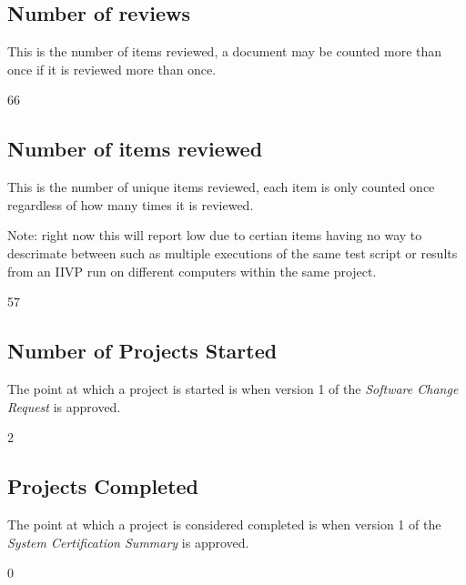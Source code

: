 \documentclass{article}
\begin{document}
\subsection{Number of reviews}
This is the number of items reviewed, a document may be counted more than once if it is reviewed
more than once.
\begin{Schunk}
\begin{Soutput}
[1] 66
\end{Soutput}
\end{Schunk}

\subsection{Number of items reviewed}
This is the number of unique items reviewed, each item is only counted once regardless of
how many times it is reviewed.

Note: right now this will report low due to certian items having no way to descrimate between
such as multiple executions of the same test script or results from an IIVP run on different
computers within the same project.
\begin{Schunk}
\begin{Soutput}
[1] 57
\end{Soutput}
\end{Schunk}

\subsection{Number of Projects Started}
The point at which a project is started is when version 1 of the \textit{Software
Change Request} is approved.

\begin{Schunk}
\begin{Soutput}
[1] 2
\end{Soutput}
\end{Schunk}

\subsection{Projects Completed}

The point at which a project is considered completed is when version 1 of the
\textit{System Certification Summary} is approved.

\begin{Schunk}
\begin{Soutput}
[1] 0
\end{Soutput}
\end{Schunk}
\end{document}
